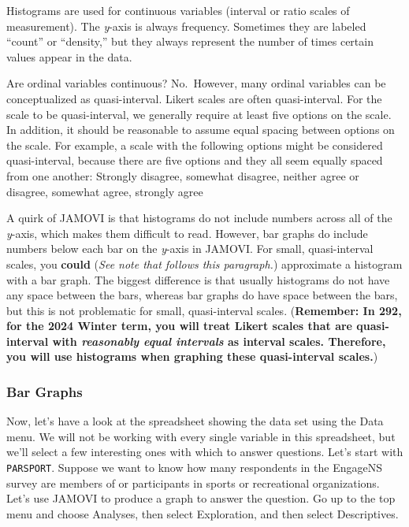 \documentclass[
]{book}
\begin{document}
Histograms are used for continuous variables (interval or ratio scales of measurement). The \emph{y}-axis is always frequency. Sometimes they are labeled ``count'' or ``density,'' but they always represent the number of times certain values appear in the data.

Are ordinal variables continuous? No.~However, many ordinal variables can be conceptualized as quasi-interval. Likert scales are often quasi-interval. For the scale to be quasi-interval, we generally require at least five options on the scale. In addition, it should be reasonable to assume equal spacing between options on the scale. For example, a scale with the following options might be considered quasi-interval, because there are five options and they all seem equally spaced from one another:
Strongly disagree, somewhat disagree, neither agree or disagree, somewhat agree, strongly agree

A quirk of JAMOVI is that histograms do not include numbers across all of the \emph{y}-axis, which makes them difficult to read. However, bar graphs do include numbers below each bar on the \emph{y}-axis in JAMOVI. For small, quasi-interval scales, you \textbf{could} (\emph{See note that follows this paragraph.}) approximate a histogram with a bar graph. The biggest difference is that usually histograms do not have any space between the bars, whereas bar graphs do have space between the bars, but this is not problematic for small, quasi-interval scales. (\textbf{Remember: In 292, for the 2024 Winter term, you will treat Likert scales that are quasi-interval with \emph{reasonably equal intervals} as interval scales. Therefore, you will use histograms when graphing these quasi-interval scales.})

\hypertarget{bar-graphs-1}{%
\subsubsection{Bar Graphs}\label{bar-graphs-1}}

Now, let's have a look at the spreadsheet showing the data set using the {Data} menu. We will not be working with every single variable in this spreadsheet, but we'll select a few interesting ones with which to answer questions. Let's start with \texttt{PARSPORT}. Suppose we want to know how many respondents in the EngageNS survey are members of or participants in sports or recreational organizations. Let's use JAMOVI to produce a graph to answer the question. Go up to the top menu and choose {Analyses}, then select {Exploration}, and then select {Descriptives}.
\end{document}
